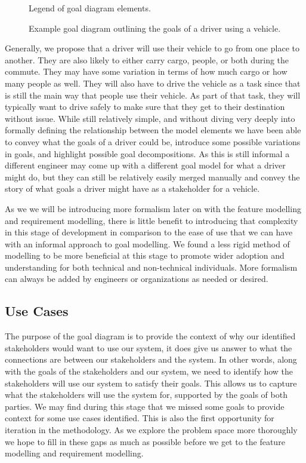 \begin{figure}
	\centering
	
	\caption{Legend of goal diagram elements.}
	\label{fig:legend}
\end{figure}

\begin{figure}
	\centering
	
	\caption{Example goal diagram outlining the goals of a driver using a vehicle.}
	\label{fig:goal_diagram_example}
\end{figure}

Generally, we propose that a driver will use their vehicle to go from one place to another. They are also likely to either carry cargo, people, or both during the commute. They may have some variation in terms of how much cargo or how many people as well. They will also have to drive the vehicle as a task since that is still the main way that people use their vehicle. As part of that task, they will typically want to drive safely to make sure that they get to their destination without issue. While still relatively simple, and without diving very deeply into formally defining the relationship between the model elements we have been able to convey what the goals of a driver could be, introduce some possible variations in goals, and highlight possible goal decompositions. As this is still informal a different engineer may come up with a different goal model for what a driver might do, but they can still be relatively easily merged manually and convey the story of what goals a driver might have as a stakeholder for a vehicle.

As we we will be introducing more formalism later on with the feature modelling and requirement modelling, there is little benefit to introducing that complexity in this stage of development in comparison to the ease of use that we can have with an informal approach to goal modelling. We found a less rigid method of modelling to be more beneficial at this stage to promote wider adoption and understanding for both technical and non-technical individuals. More formalism can always be added by engineers or organizations as needed or desired.

\subsection{Use Cases}

The purpose of the goal diagram is to provide the context of why our identified stakeholders would want to use our system, it does give us answer to what the connections are between our stakeholders and the system. In other words, along with the goals of the stakeholders and our system, we need to identify how the stakeholders will use our system to satisfy their goals. This allows us to capture what the stakeholders will use the system for, supported by the goals of both parties. We may find during this stage that we missed some goals to provide context for some use cases identified. This is also the first opportunity for iteration in the methodology. As we explore the problem space more thoroughly we hope to fill in these gaps as much as possible before we get to the feature modelling and requirement modelling.

